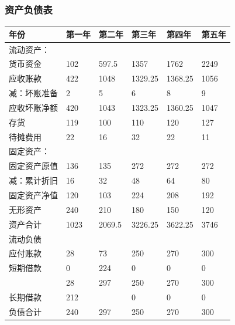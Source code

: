 \documentclass[master]{hduthesis}
\begin{document}
\subsubsection{资产负债表}
\begin{table}[H]
	\centering
	\begin{tabular}{|l|l|l|l|l|l|}
		\hline
		年份                 & 第一年 & 第二年 & 第三年  & 第四年  & 第五年 \\ \hline
		流动资产：           &        &        &         &         &        \\ \hline
		货币资金             & 102    & 597.5  & 1357    & 1762    & 2249   \\ \hline
		应收账款             & 422    & 1048   & 1329.25 & 1368.25 & 1056   \\ \hline
		减：坏账准备         & 2      & 5      & 6       & 8       & 9      \\ \hline
		应收坏账净额         & 420    & 1043   & 1323.25 & 1360.25 & 1047   \\ \hline
		存货                 & 119    & 100    & 110     & 120     & 127    \\ \hline
		待摊费用             & 22     & 16     & 32      & 22      & 11     \\ \hline

		固定资产：           &        &        &         &         &        \\ \hline
		固定资产原值         & 136    & 135    & 272     & 272     & 272    \\ \hline
		减：累计折旧         & 16     & 32     & 48      & 64      & 80     \\ \hline
		固定资产净值         & 120    & 103    & 224     & 208     & 192    \\ \hline
		无形资产             & 240    & 210    & 180     & 150     & 120    \\ \hline
		资产合计             & 1023   & 2069.5 & 3226.25 & 3622.25 & 3746   \\ \hline

		流动负债             &        &        &         &         &        \\ \hline
		应付账款             & 28     & 73     & 250     & 270     & 300    \\ \hline
		短期借款             & 0      & 224    & 0       & 0       & 0      \\ \hline
		                     & 28     & 297    & 250     & 270     & 300    \\ \hline
		长期借款             & 212    &        & 0       & 0       & 0      \\ \hline
		负债合计             & 240    & 297    & 250     & 270     & 300    \\ \hline


\end{tabular}
\end{table}
\end{document}
